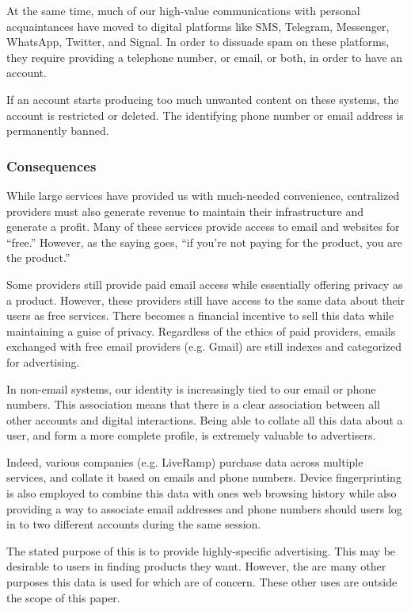 \documentclass{article}
\begin{document}
At the same time, much of our high-value communications with personal acquaintances have moved to digital platforms like SMS, Telegram, Messenger, WhatsApp, Twitter, and Signal. In order to dissuade spam on these platforms, they require providing a telephone number, or email, or both, in order to have an account.

If an account starts producing too much unwanted content on these systems, the account is restricted or deleted. The identifying phone number or email address is permanently banned.

\subsubsection{Consequences}


While large services have provided us with much-needed convenience, centralized providers must also generate revenue to maintain their infrastructure and generate a profit. Many of these services provide access to email and websites for ``free.'' However, as the saying goes, ``if you're not paying for the product, you are the product.''

Some providers still provide paid email access while essentially offering privacy as a product. However, these providers still have access to the same data about their users as free services. There becomes a financial incentive to sell this data while maintaining a guise of privacy. Regardless of the ethics of paid providers, emails exchanged with free email providers (e.g. Gmail) are still indexes and categorized for advertising.

In non-email systems, our identity is increasingly tied to our email or phone numbers. This association means that there is a clear association between all other accounts and digital interactions. Being able to collate all this data about a user, and form a more complete profile, is extremely valuable to advertisers.

Indeed, various companies (e.g. LiveRamp) purchase data across multiple services, and collate it based on emails and phone numbers. Device fingerprinting is also employed to combine this data with ones web browsing history while also providing a way to associate email addresses and phone numbers should users log in to two different accounts during the same session.

The stated purpose of this is to provide highly-specific advertising. This may be desirable to users in finding products they want. However, the are many other purposes this data is used for which are of concern. These other uses are outside the scope of this paper.
\end{document}
